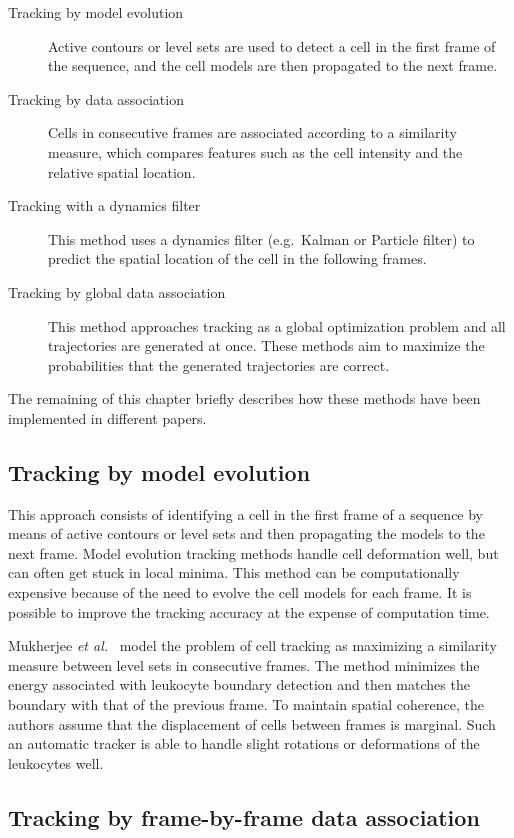 \begin{description}
	\item [Tracking by model evolution] Active contours or level sets are used to detect a cell in the first frame of the sequence, and the cell models are then propagated to the next frame.
	\item [Tracking by data association] Cells in consecutive frames are associated according to a similarity measure, which compares features such as the cell intensity and the relative spatial location.
	\item [Tracking with a dynamics filter] This method uses a dynamics filter (e.g.\ Kalman or Particle filter) to predict the spatial location of the cell in the following frames.
	\item [Tracking by global data association] This method approaches tracking as a global optimization problem and all trajectories are generated at once. These methods aim to maximize the probabilities that the generated trajectories are correct.
\end{description}

The remaining of this chapter briefly describes how these methods have been implemented in different papers.

\subsection{Tracking by model evolution \statusfirstdraft}

This approach consists of identifying a cell in the first frame of a sequence by means of active contours or level sets and then propagating the models to the next frame. Model evolution tracking methods handle cell deformation well, but can often get stuck in local minima. This method can be computationally expensive because of the need to evolve the cell models for each frame. It is possible to improve the tracking accuracy at the expense of computation time.

Mukherjee \emph{et al.}~\cite{mukherjee04} model the problem of cell tracking as maximizing a similarity measure between level sets in consecutive frames. The method minimizes the energy associated with leukocyte boundary detection and then matches the boundary with that of the previous frame. To maintain spatial coherence, the authors assume that the displacement of cells between frames is marginal. Such an automatic tracker is able to handle slight rotations or deformations of the leukocytes well.

\subsection{Tracking by frame-by-frame data association \statusfirstdraft}

